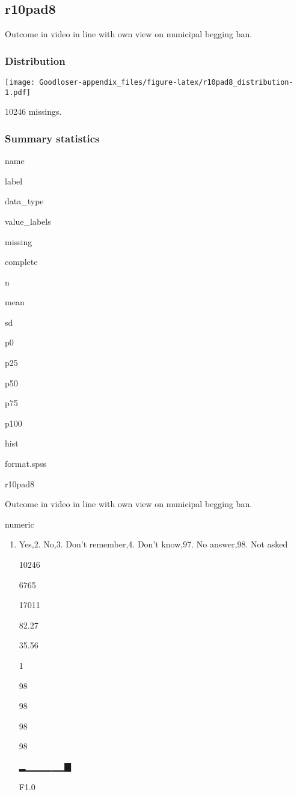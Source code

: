 \documentclass[]{book}
\providecommand{\tightlist}{%
  \setlength{\itemsep}{0pt}\setlength{\parskip}{0pt}}
\begin{document}
\subsection{r10pad8}\label{r10pad8}

Outcome in video in line with own view on municipal begging ban.

\subsubsection{Distribution}\label{r10pad8_distribution}

\texttt{[image: Goodloser-appendix\_files/figure-latex/r10pad8\_distribution-1.pdf]}

10246 missings.

\subsubsection{Summary statistics}\label{r10pad8_summary}

name

label

data\_type

value\_labels

missing

complete

n

mean

sd

p0

p25

p50

p75

p100

hist

format.spss

r10pad8

Outcome in video in line with own view on municipal begging ban.

numeric

\begin{enumerate}
\def\labelenumi{\arabic{enumi}.}
\tightlist
\item
  Yes,2. No,3. Don't remember,4. Don't know,97. No answer,98. Not asked

  10246

  6765

  17011

  82.27

  35.56

  1

  98

  98

  98

  98

  ▂▁▁▁▁▁▁▇

  F1.0
\end{enumerate}
\end{document}
